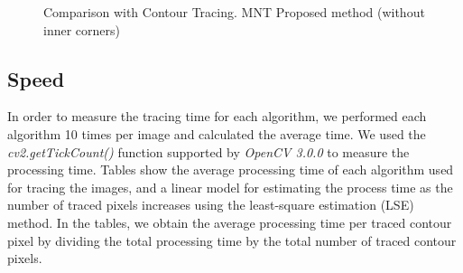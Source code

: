 \begin{figure}[htbp]
	\centering

	\caption{Comparison with Contour Tracing. \protect{} MNT \protect{} Proposed method (without inner corners)}
	\label{fig:image16}
\end{figure}


\subsection{Speed}


In order to measure the tracing time for each algorithm, we performed each algorithm 10 times per image and calculated the average time. We used the \textit{cv2.getTickCount()}  function supported by \textit{OpenCV 3.0.0}  to measure the processing time. Tables  show the average processing time of each algorithm used for tracing the images, and a linear model for estimating the process time as the number of traced pixels increases using the least-square estimation (LSE) method. In the tables, we obtain the average processing time per traced contour pixel by dividing the total processing time by the total number of traced contour pixels.

